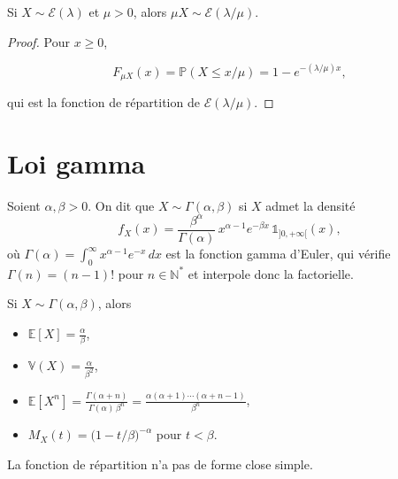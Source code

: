 \medskip

\begin{mdframed}
\begin{lemme}
Si $X\sim\mathcal{E}(\lambda)$ et $\mu>0$, alors $\mu X\sim\mathcal{E}(\lambda/\mu)$.
\end{lemme}
\end{mdframed}

\begin{proof}
Pour $x\ge0$, 

$$
F_{\mu X}(x)=\mathbb{P}(X\le x/\mu)=1-e^{-(\lambda/\mu)x}, 
$$

qui est la fonction de répartition de $\mathcal{E}(\lambda/\mu)$.
\end{proof}

\section{Loi gamma}

\medskip

\begin{mdframed}
\begin{definition}
Soient $\alpha,\beta>0$. On dit que $X\sim\Gamma(\alpha,\beta)$ si $X$ admet
la densité
\[
  f_X(x)=\frac{\beta^\alpha}{\Gamma(\alpha)}\,x^{\alpha-1}e^{-\beta x}
  \,\mathbb{1}_{]0,+\infty[}(x),
\]
où $\displaystyle\Gamma(\alpha)=\int_0^\infty x^{\alpha-1}e^{-x}\,dx$ est la
fonction gamma d'Euler, qui vérifie $\Gamma(n)=(n-1)!$ pour $n\in\mathbb{N}^*$ et
interpole donc la factorielle.
\end{definition}
\end{mdframed}

\medskip

\begin{mdframed}
\begin{proposition}
\label{prop:gamma-moments}
Si $X\sim\Gamma(\alpha,\beta)$, alors

\begin{itemize}
\item $\mathbb{E}[X]=\frac{\alpha}{\beta}$,
\item $\mathbb{V}(X)=\frac{\alpha}{\beta^2}$,
\item $\mathbb{E}[X^n]=\frac{\Gamma(\alpha+n)}{\Gamma(\alpha)\,\beta^n} =\frac{\alpha(\alpha+1)\cdots(\alpha+n-1)}{\beta^n}$,
\item $M_X(t)=\big(1-t/\beta\big)^{-\alpha}$ pour $t<\beta$.
\end{itemize}

La fonction de répartition n'a pas de forme close simple.
\end{proposition}
\end{mdframed}

